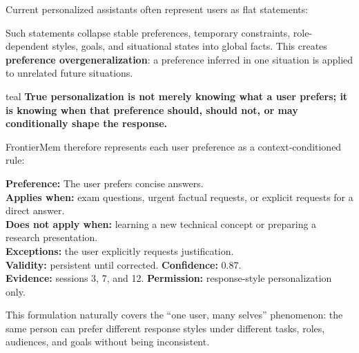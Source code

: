 \documentclass[10.5pt,a4paper]{article}
\begin{document}
Current personalized assistants often represent users as flat statements:
\begin{center}
\end{center}

Such statements collapse stable preferences, temporary constraints, role-dependent styles, goals, and situational states into global facts. This creates \textbf{preference overgeneralization}: a preference inferred in one situation is applied to unrelated future situations.

\begin{keybox}{teal}
\textbf{True personalization is not merely knowing what a user prefers; it is knowing when that preference should, should not, or may conditionally shape the response.}
\end{keybox}

FrontierMem therefore represents each user preference as a context-conditioned rule:
\begin{tcolorbox}[colback=softgray,colframe=linegray,arc=2mm,boxrule=0.7pt]
\small
\textbf{Preference:} The user prefers concise answers.\\
\textbf{Applies when:} exam questions, urgent factual requests, or explicit requests for a direct answer.\\
\textbf{Does not apply when:} learning a new technical concept or preparing a research presentation.\\
\textbf{Exceptions:} the user explicitly requests justification.\\
\textbf{Validity:} persistent until corrected. \quad
\textbf{Confidence:} 0.87.\\
\textbf{Evidence:} sessions 3, 7, and 12. \quad
\textbf{Permission:} response-style personalization only.
\end{tcolorbox}

This formulation naturally covers the ``one user, many selves'' phenomenon: the same person can prefer different response styles under different tasks, roles, audiences, and goals without being inconsistent.
\end{document}
